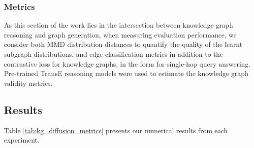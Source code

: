 \subsubsection{Metrics}

As this section of the work lies in the intersection between knowledge graph reasoning and graph generation, when measuring evaluation performance, we consider both MMD distribution distances to quantify the quality of the learnt subgraph distributions, and edge classification metrics in addition to the contrastive loss for knowledge graphs, in the form for single-hop query answering. Pre-trained TransE \cite{bordes_translating_2013} reasoning models were used to estimate the knowledge graph validity metrics.

\subsection{Results}

Table \ref{tab:kg_diffusion_metrics} presents our numerical results from each experiment.


